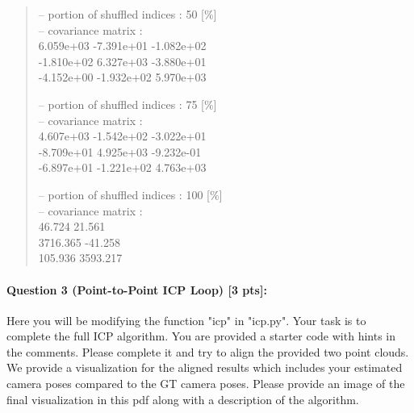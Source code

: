 \documentclass[11pt]{article}
\begin{document}
\begin{quote}
{-- portion of shuffled indices : 50 [\%] \\
-- covariance matrix : \\
\lbrack \lbrack  6.059e+03 -7.391e+01 -1.082e+02 \rbrack \\
\lbrack -1.810e+02  6.327e+03 -3.880e+01 \rbrack \\
\lbrack -4.152e+00 -1.932e+02  5.970e+03 \rbrack \rbrack

-- portion of shuffled indices : 75 [\%] \\
-- covariance matrix : \\
\lbrack \lbrack  4.607e+03 -1.542e+02 -3.022e+01 \rbrack \\
\lbrack -8.709e+01  4.925e+03 -9.232e-01 \rbrack \\
\lbrack -6.897e+01 -1.221e+02  4.763e+03 \rbrack \rbrack

-- portion of shuffled indices : 100 [\%] \\
-- covariance matrix : \\
\lbrack {}   46.724   21.561 \rbrack \\
 3716.365  -41.258 \rbrack \\
  105.936 3593.217 \rbrack \rbrack
}

\end{quote}

\paragraph{Question 3 (Point-to-Point ICP Loop) [3 pts]:} Here you will be modifying the function "icp" in "icp.py". Your task is to complete the full ICP algorithm. You are provided a starter code with hints in the comments. Please complete it and try to align the provided two point clouds. We provide a visualization for the aligned results which includes your estimated camera poses compared to the GT camera poses. Please provide an image of the final visualization in this pdf along with a description of the algorithm.
\end{document}
